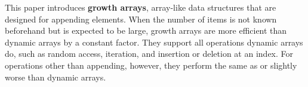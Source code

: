 This paper introduces \textbf{growth arrays}, array-like data structures that are designed for appending elements. When the number of items is not known beforehand but is expected to be large, growth arrays are more efficient than dynamic arrays by a constant factor. They support all operations dynamic arrays do, such as random access, iteration, and insertion or deletion at an index. For operations other than appending, however, they perform the same as or slightly worse than dynamic arrays.